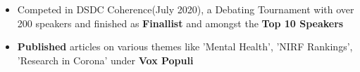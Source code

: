 
\begin{itemize}
  \item {Competed in DSDC Coherence(July 2020), a Debating Tournament with over 200 speakers and finished as \textbf{Finallist} and amongst the \textbf{Top 10 Speakers}}
  \item {\textbf{Published} articles on various themes like 'Mental Health', 'NIRF Rankings', 'Research in Corona' under \textbf{Vox Populi}}
\end{itemize}